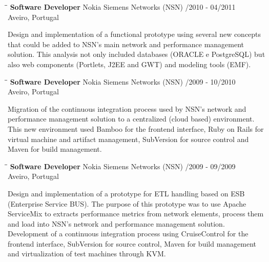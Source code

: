 \documentclass{res}
\begin{document}
\begin{resume}
\begin{tabbing}
\hspace{2.3in}\= \hspace{2.6in}\= \kill %
{\bf Software Developer} \>Nokia Siemens Networks (NSN)    
/2010 - 04/2011\\ \>Aveiro, Portugal
\end{tabbing}\vspace{-20pt}      %
Design and implementation of a functional prototype using several new concepts that could be added to NSN's main network and performance management solution.
This analysis not only included databases (ORACLE e PostgreSQL) but also web components (Portlets, J2EE and GWT) and modeling tools (EMF).

\begin{tabbing}
\hspace{2.3in}\= \hspace{2.6in}\= \kill %
{\bf Software Developer} \>Nokia Siemens Networks (NSN)    
/2009 - 10/2010\\ \>Aveiro, Portugal
\end{tabbing}\vspace{-20pt}      %
Migration of the continuous integration process used by NSN's network and
performance management solution to a centralized (cloud based) environment. This new environment used Bamboo for the frontend interface, Ruby on Rails for
virtual machine and artifact management, SubVersion for source control and Maven for build management.

\begin{tabbing}
\hspace{2.3in}\= \hspace{2.6in}\= \kill %
{\bf Software Developer} \>Nokia Siemens Networks (NSN)    
/2009 - 09/2009\\ \>Aveiro, Portugal
\end{tabbing}\vspace{-20pt}      %
Design and implementation of a prototype for ETL handling based on ESB
(Enterprise Service BUS). The purpose of this prototype was to use Apache
ServiceMix to extracts performance metrics from network elements, process them
and load into NSN's network and performance management solution. Development of
a continuous integration process using CruiseControl for the frontend
interface, SubVersion for source control, Maven for build management and
virtualization of test machines through KVM.


\end{resume}
\end{document}
